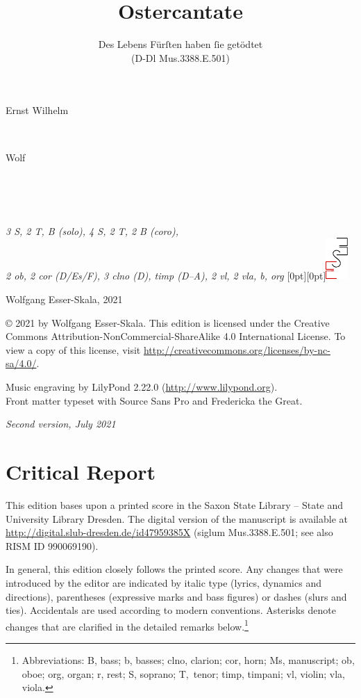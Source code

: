 \documentclass[parskip=full]{scrreprt}
\makeatletter
\DeclareRobustCommand{\sbseries}{\fontseries{sb}\selectfont}
\newcommand\fancytitlehead{
  \headingfont%
  \fontsize{80}{80}\selectfont\textcolor{black!80}{\@ifundefined{@shortname}{\@lastname}{\@shortname}.}\\[15pt]%
  \fontsize{60}{60}\selectfont\@ifundefined{@shorttitle}{\@title}{\@shorttitle}.%
}
\def\firstname#1{\def\@firstname{#1}}
\def\lastname#1{\def\@lastname{#1}}
\def\instrumentation#1{\def\@instrumentation{#1}}
\def\maketitle{%
\begin{titlepage}%
  \Large%
  {\@titlehead}%
  \vfill%
  {\strut\@firstname}\\%
  {\sbseries\color{oldred}\strut\@lastname}\\%
  {\strut\@namesuffix}%
  \vfill%
  {\sbseries\@title}\\%
  {\@subtitle}\\[\baselineskip]%
  {\itshape\@instrumentation}%
  \vfill%
  {\itshape\@parts}\hspace*{\fill}\raisebox{0pt}[0pt][0pt]{\includegraphics{ees_logo}}%
\end{titlepage}%
}
\newif\ifprintreport\printreportfalse
\makeatother
\begin{document}
\frenchspacing

\titlehead{\fancytitlehead}
\firstname{Ernst Wilhelm}
\lastname{Wolf}
\title{Ostercantate}
\subtitle{Des Lebens Fürſten haben ſie getödtet\\(D-Dl Mus.3388.E.501)}
\instrumentation{3 S, 2 T, B (solo), 4 S, 2 T, 2 B (coro),\\2 ob, 2 cor (D/Es/F), 3 clno (D), timp (D–A), 2 vl, 2 vla, b, org}
\maketitle


\thispagestyle{empty}

\vspace*{\fill}

\hspace*{1em}Wolfgang Esser-Skala, 2021

© 2021 by Wolfgang Esser-Skala. This edition is licensed under the Creative Commons Attribution-NonCommercial-ShareAlike 4.0 International License. To view a copy of this license, visit \url{http://creativecommons.org/licenses/by-nc-sa/4.0/}.

Music engraving by LilyPond 2.22.0 (\url{http://www.lilypond.org}).\\
Front matter typeset with Source Sans Pro and Fredericka the Great.

\textit{Second version, July 2021}

\vspace*{2cm}

\ifprintreport
\chapter*{Critical Report}

This edition bases upon a printed score in the Saxon State Library – State and University Library Dresden. The digital version of the manuscript is available at \url{http://digital.slub-dresden.de/id47959385X} (siglum Mus.3388.E.501; see also RISM ID 990069190).

In general, this edition closely follows the printed score. Any changes that were introduced by the editor are indicated by italic type (lyrics, dynamics and directions), parentheses (expressive marks and bass figures) or dashes (slurs and ties). Accidentals are used according to modern conventions. Asterisks denote changes that are clarified in the detailed remarks below.\footnote{Abbreviations: B, bass; b, basses; clno, clarion; cor, horn; Ms, manuscript; ob, oboe; org, organ; r, rest; S, soprano; T,~tenor; timp, timpani; vl, violin; vla, viola.}
\end{document}
